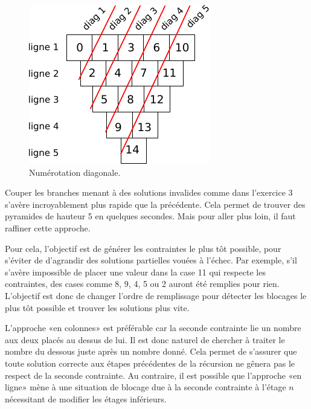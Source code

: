 \documentclass[10pt]{article}\usepackage[correction,nu]{esial}
\begin{document}
\begin{figure}
  \vspace{-.6\baselineskip}
  \centerline{\includegraphics[scale=.9]{img/numerotation-diagonales.pdf}}
  \vspace{-.5\baselineskip}
  \caption{Numérotation diagonale.}
  \label{fig:numdiag}
   \vspace{-1.5\baselineskip}
\end{figure}

  Couper les branches menant à des solutions invalides comme dans l'exercice 3
  s'avère incroyablement plus rapide que la précédente. Cela permet de trouver
  des pyramides de hauteur 5 en quelques secondes. Mais pour aller plus loin, il
  faut raffiner cette approche. 

  Pour cela, l'objectif est de générer les contraintes le plus tôt possible,
  pour s'éviter de d'agrandir des solutions partielles vouées à l'échec. Par
  exemple, s'il s'avère impossible de placer une valeur dans la case 11 qui
  respecte les contraintes, des cases comme 8, 9, 4, 5 ou 2 auront été remplies
  pour rien. L'objectif est donc de changer l'ordre de remplissage pour détecter
  les blocages le plus tôt possible et trouver les solutions plus vite.

  L'approche «en colonnes» est préférable car la seconde contrainte lie un
  nombre aux deux placés au dessus de lui. Il est donc naturel de chercher à
  traiter le nombre du dessous juste après un nombre donné. Cela permet de
  s'assurer que toute solution correcte aux étapes précédentes de la récursion
  ne gênera pas le respect de la seconde contrainte. Au contraire, il est
  possible que l'approche «en ligne» mène à une situation de blocage due à la
  seconde contrainte à l'étage $n$ nécessitant de modifier les étages
  inférieurs.
\end{document}

